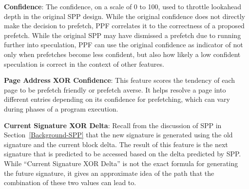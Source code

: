 %
\noindent \textbf{Confidence}: The confidence, on a scale of 0 to 100,
used to throttle lookahead depth in the original SPP design.  While
the original confidence does not directly make the decision to
prefetch, PPF correlates it to the correctness of a proposed prefetch.
While the original SPP may have dismissed a prefetch due to running
further into speculation, PPF can use the original confidence as
indicator of not only when prefetches become less confident, but also
how likely a low confident speculation is correct in the context of
other features.

\noindent \textbf{Page Address XOR Confidence}: This feature scores
the tendency of each page to be prefetch friendly or prefetch averse.
It helps resolve a page into different entries depending on its
confidence for prefetching, which can vary during phases of a program
execution.

\noindent \textbf{Current Signature XOR Delta}: Recall from the
discussion of SPP in Section~\ref{Background-SPP} that the new
signature is generated using the old signature and the current block
delta.  The result of this feature is the next signature that is
predicted to be accessed based on the delta predicted by SPP. While
``Current Signature XOR Delta'' is not the exact formula for
generating the future signature, it gives an approximate idea of the
path that the combination of these two values can lead to.

%


